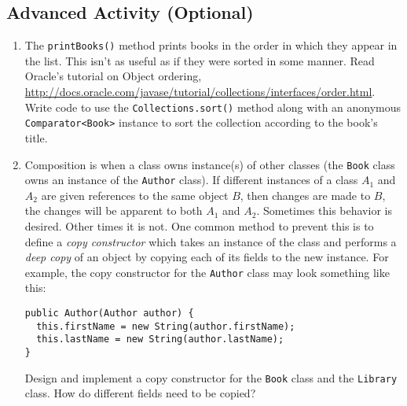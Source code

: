 \documentclass[12pt]{scrartcl}
\begin{document}
\subsection*{Advanced Activity (Optional)}


\begin{enumerate}
  \item The \texttt{printBooks()} method prints books in the 
  	order in which they appear in the list.  This isn't as useful as if 
	they were sorted in some manner.  Read Oracle's tutorial on Object 
	ordering, \url{http://docs.oracle.com/javase/tutorial/collections/interfaces/order.html}.  Write code to use the 
	\texttt{Collections.sort()} method along with an anonymous
	\texttt{Comparator<Book>} instance to sort the collection 
	according to the book's title.
  \item Composition is when a class owns instance(s) of other classes 
	(the \texttt{Book} class owns an instance of the 
	\texttt{Author} class).  If different instances of a 
	class $A_1$ and $A_2$ are given references to the same object $B$, 
	then changes are made to $B$, the changes will be apparent to both 
	$A_1$ and $A_2$.  Sometimes this behavior is desired.  Other times 
	it is not.  One common method to prevent this is to define a 
	\emph{copy constructor} which takes an instance of the class 
	and performs a \emph{deep copy} of an object by copying each of 
	its fields to the new instance.  For example, the copy constructor 
	for the \texttt{Author} class may look something like this:
	
\begin{verbatim}
public Author(Author author) {
  this.firstName = new String(author.firstName);
  this.lastName = new String(author.lastName);
}
\end{verbatim}
	
	Design and implement a copy constructor for the \texttt{Book} 
	class and the \texttt{Library} class.  How do different 
	fields need to be copied?
\end{enumerate}
\end{document}
